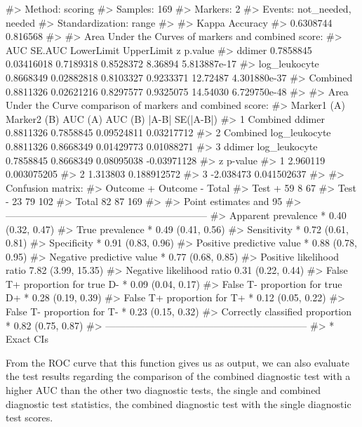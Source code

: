 \documentclass[]{article}
\renewenvironment{verbatim}{\color{codecolor}\begin{myshaded}\begin{oldverbatim}}{\end{oldverbatim}\end{myshaded}}
\begin{document}
\begin{verbatim}
#> Method: scoring 
#> Samples: 169 
#> Markers: 2 
#> Events: not_needed, needed 
#> Standardization: range 
#> 
#>  Kappa       Accuracy  
#>  0.6308744   0.816568
#> 
#> Area Under the Curves of markers and combined score:  
#>                     AUC     SE.AUC LowerLimit UpperLimit        z      p.value
#> ddimer        0.7858845 0.03416018  0.7189318  0.8528372  8.36894 5.813887e-17
#> log_leukocyte 0.8668349 0.02882818  0.8103327  0.9233371 12.72487 4.301880e-37
#> Combined      0.8811326 0.02621216  0.8297577  0.9325075 14.54030 6.729750e-48
#> 
#> Area Under the Curve comparison of markers and combined score:  
#>   Marker1 (A)   Marker2 (B)   AUC (A)   AUC (B)      |A-B|   SE(|A-B|)
#> 1    Combined        ddimer 0.8811326 0.7858845 0.09524811  0.03217712
#> 2    Combined log_leukocyte 0.8811326 0.8668349 0.01429773  0.01088271
#> 3      ddimer log_leukocyte 0.7858845 0.8668349 0.08095038 -0.03971128
#>           z     p-value
#> 1  2.960119 0.003075205
#> 2  1.313803 0.188912572
#> 3 -2.038473 0.041502637
#> 
#> Confusion matrix:  
#>           Outcome +    Outcome -      Total
#> Test +           59            8         67
#> Test -           23           79        102
#> Total            82           87        169
#> 
#> Point estimates and 95% CIs:
#> --------------------------------------------------------------
#> Apparent prevalence *                  0.40 (0.32, 0.47)
#> True prevalence *                      0.49 (0.41, 0.56)
#> Sensitivity *                          0.72 (0.61, 0.81)
#> Specificity *                          0.91 (0.83, 0.96)
#> Positive predictive value *            0.88 (0.78, 0.95)
#> Negative predictive value *            0.77 (0.68, 0.85)
#> Positive likelihood ratio              7.82 (3.99, 15.35)
#> Negative likelihood ratio              0.31 (0.22, 0.44)
#> False T+ proportion for true D- *      0.09 (0.04, 0.17)
#> False T- proportion for true D+ *      0.28 (0.19, 0.39)
#> False T+ proportion for T+ *           0.12 (0.05, 0.22)
#> False T- proportion for T- *           0.23 (0.15, 0.32)
#> Correctly classified proportion *      0.82 (0.75, 0.87)
#> --------------------------------------------------------------
#> * Exact CIs
\end{verbatim}

From the ROC curve that this function gives us as output, we can also evaluate the test results regarding the comparison of the combined diagnostic test with a higher AUC than the other two diagnostic tests, the single and combined diagnostic test statistics, the combined diagnostic test with the single diagnostic test scores.
\end{document}
